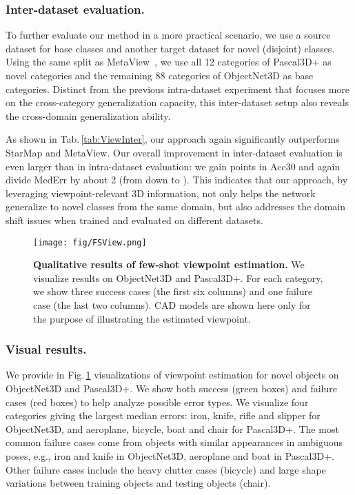 \documentclass[runningheads]{llncs}
\begin{document}
\subsubsection{Inter-dataset evaluation.}
To further evaluate our method in a more practical scenario, we use a source dataset for base classes and another target dataset for novel (disjoint) classes.
Using the same split as MetaView~\cite{Tseng2019FewShotVE}, we use all 12 categories of Pascal3D+ as novel categories and the remaining 88 categories of ObjectNet3D as base categories.
Distinct from the previous intra-dataset experiment that focuses more on the cross-category generalization capacity, this inter-dataset setup also reveals the cross-domain generalization ability.

As shown in Tab.\,\ref{tab:ViewInter}, our approach again significantly outperforms StarMap and MetaView.
Our overall improvement in inter-dataset evaluation is even larger than in intra-dataset evaluation: we gain  points in Acc30 and again divide MedErr by about 2 (from  down to ).
This indicates that our approach, by leveraging viewpoint-relevant 3D information, not only helps the network generalize to novel classes from the same domain, but also addresses the domain shift issues when trained and evaluated on different datasets.

\begin{figure}[t]
\centering
\texttt{[image: fig/FSView.png]}
\vspace{-6mm}
\caption{{\bf Qualitative results of few-shot viewpoint estimation.}
We visualize results on ObjectNet3D and Pascal3D+. For each category, we show three success cases (the first six columns) and one failure case (the last two columns). CAD models are shown here only for the purpose of illustrating the estimated viewpoint. 
}
\label{fig:fsView}
\end{figure}



\subsubsection{Visual results.}
We provide in Fig.\,\ref{fig:fsView} visualizations of viewpoint estimation for novel objects on ObjectNet3D and Pascal3D+.
We show both success (green boxes) and failure cases (red boxes) to help analyze possible error types.
We visualize four categories giving the largest median errors: iron, knife, rifle and slipper for ObjectNet3D, and aeroplane, bicycle, boat and chair for Pascal3D+.
The most common failure cases come from objects with similar appearances in ambiguous poses, e.g., iron and knife in ObjectNet3D, aeroplane and boat in Pascal3D+.
Other failure cases include the heavy clutter cases (bicycle) and large shape variations between training objects and testing objects (chair).
\end{document}
